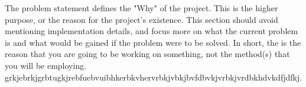  The problem statement defines the "Why" of the project. This is the higher purpose, or the reason for the project's existence. This section should avoid mentioning implementation details, and focus more on what the current problem is and what would be gained if the problem were to be solved. In short, the is the reason that you are going to be working on something, not the method(s) that you will be employing. grkjebrkjgrbtugkjrebfuebvuibhkerbkvhervrbkjvbkjbvfdbvkjvrbkjvrdbkhdvkdfjdfkj.